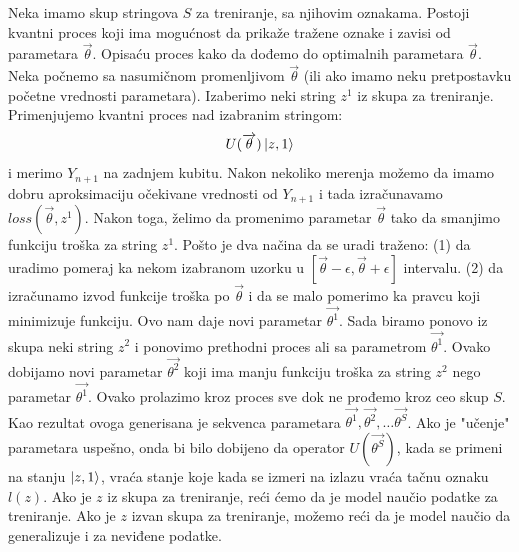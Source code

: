 \documentclass[12pt, letterpaper, oneside]{article}
\begin{document}
Neka imamo skup stringova \(S\) za treniranje, sa njihovim oznakama. Postoji kvantni proces koji ima mogućnost da
prikaže tražene oznake i zavisi od parametara $\overrightarrow{\theta}$. Opisaću proces kako da dođemo do optimalnih parametara $\overrightarrow{\theta}$.
Neka počnemo sa nasumičnom promenljivom $\overrightarrow{\theta}$ (ili ako imamo neku pretpostavku početne vrednosti parametara). Izaberimo neki string $z^1$ iz skupa za treniranje.
Primenjujemo kvantni proces nad izabranim stringom:
\[
    U(\overrightarrow{\theta})\Ket{z,1}
\] 
i merimo $Y_{n+1}$ na zadnjem kubitu. Nakon nekoliko merenja možemo da imamo dobru aproksimaciju očekivane vrednosti od $Y_{n+1}$
i tada izračunavamo $\mathit{loss}(\overrightarrow{\theta},z^1)$. Nakon toga, želimo da promenimo parametar $\overrightarrow{\theta}$ tako da smanjimo
funkciju troška za string $z^1$. Pošto je dva načina da se uradi traženo: (1) da uradimo pomeraj ka nekom izabranom uzorku u $[\overrightarrow{\theta}-\epsilon,\overrightarrow{\theta}+\epsilon]$ intervalu.
(2) da izračunamo izvod funkcije troška po $\overrightarrow{\theta}$ i da se malo pomerimo ka pravcu koji minimizuje funkciju.
Ovo nam daje novi parametar $\overrightarrow{\theta^1}$. Sada biramo ponovo iz skupa neki string $z^2$ i ponovimo prethodni proces ali sa parametrom $\overrightarrow{\theta^1}$.
Ovako dobijamo novi parametar $\overrightarrow{\theta^2}$ koji ima manju funkciju troška za string $z^2$ nego parametar $\overrightarrow{\theta^1}$.
Ovako prolazimo kroz proces sve dok ne prođemo kroz ceo skup $S$. Kao rezultat ovoga generisana je sekvenca parametara $\overrightarrow{\theta^1}, \overrightarrow{\theta^2}, \dots \overrightarrow{\theta^S}$.
Ako je "učenje" parametara uspešno, onda bi bilo dobijeno da operator $U(\overrightarrow{\theta^S})$, kada se primeni na stanju $\Ket{z,1}$, vraća stanje koje kada se izmeri na izlazu vraća tačnu oznaku $l(z)$.
Ako je $z$ iz skupa za treniranje, reći ćemo da je model naučio podatke za treniranje. Ako je $z$ izvan skupa za treniranje, možemo reći da je model naučio da generalizuje i za neviđene podatke.
\end{document}
